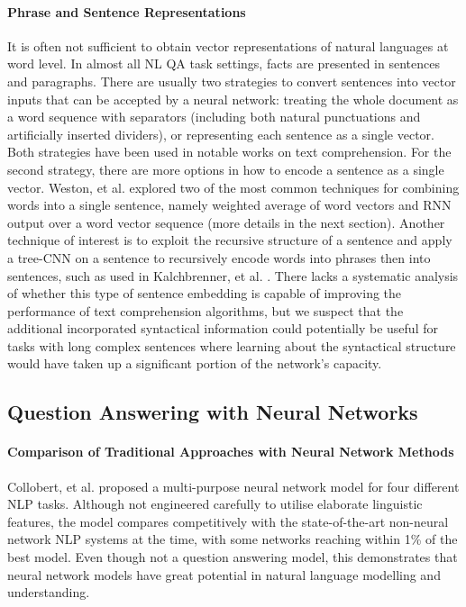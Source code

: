 \documentclass[]{article}
\begin{document}
\paragraph{Phrase and Sentence Representations}
It is often not sufficient to obtain vector representations of natural languages at word level. In almost all NL QA task settings, facts are presented in sentences and paragraphs. There are usually two strategies to convert sentences into vector inputs that can be accepted by a neural network: treating the whole document as a word sequence with separators (including both natural punctuations and artificially inserted dividers), or representing each sentence as a single vector. Both strategies have been used in notable works on text comprehension. For the second strategy, there are more options in how to encode a sentence as a single vector. Weston, et al. \cite{weston2014memory} explored two of the most common techniques for combining words into a single sentence, namely weighted average of word vectors and RNN output over a word vector sequence (more details in the next section).  
Another technique of interest is to exploit the recursive structure of a sentence and apply a tree-CNN on a sentence to recursively encode words into phrases then into sentences, such as used in Kalchbrenner, et al. \cite{kalchbrenner2014convolutional}. There lacks a systematic analysis of whether this type of sentence embedding is capable of improving the performance of text comprehension algorithms, but we suspect that the additional incorporated syntactical information could potentially be useful for tasks with long complex sentences where learning about the syntactical structure would have taken up a significant portion of the network’s capacity. 

\subsection{Question Answering with Neural Networks}

\paragraph{Comparison of Traditional Approaches with Neural Network Methods}
Collobert, et al. \cite{collobert2011natural} proposed a multi-purpose neural network model for four different NLP tasks. Although not engineered carefully to utilise elaborate linguistic features, the model compares competitively with the state-of-the-art non-neural network NLP systems at the time, with some networks reaching within 1\% of the best model. Even though not a question answering model, this demonstrates that neural network models have great potential in natural language modelling and understanding.
\end{document}
